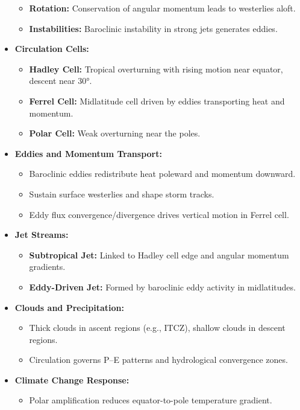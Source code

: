 \documentclass[fontsize=8pt, a4paper, landscape, fleqn]{scrartcl}
\begin{document}
\begin{multicols*}{3}[\raggedcolumns]
\begin{itemize}
\begin{itemize}
        \item \textbf{Rotation:} Conservation of angular momentum leads to westerlies aloft.
        \item \textbf{Instabilities:} Baroclinic instability in strong jets generates eddies.
    \end{itemize}
    \item \textbf{Circulation Cells:}
    \begin{itemize}
        \item \textbf{Hadley Cell:} Tropical overturning with rising motion near equator, descent near 30°.
        \item \textbf{Ferrel Cell:} Midlatitude cell driven by eddies transporting heat and momentum.
        \item \textbf{Polar Cell:} Weak overturning near the poles.
    \end{itemize}
    \item \textbf{Eddies and Momentum Transport:}
    \begin{itemize}
        \item Baroclinic eddies redistribute heat poleward and momentum downward.
        \item Sustain surface westerlies and shape storm tracks.
        \item Eddy flux convergence/divergence drives vertical motion in Ferrel cell.
    \end{itemize}
    \item \textbf{Jet Streams:}
    \begin{itemize}
        \item \textbf{Subtropical Jet:} Linked to Hadley cell edge and angular momentum gradients.
        \item \textbf{Eddy-Driven Jet:} Formed by baroclinic eddy activity in midlatitudes.
    \end{itemize}
    \item \textbf{Clouds and Precipitation:}
    \begin{itemize}
        \item Thick clouds in ascent regions (e.g., ITCZ), shallow clouds in descent regions.
        \item Circulation governs P–E patterns and hydrological convergence zones.
    \end{itemize}
    \item \textbf{Climate Change Response:}
    \begin{itemize}
        \item Polar amplification reduces equator-to-pole temperature gradient.

\end{itemize}
\end{itemize}
\end{multicols*}
\end{document}
